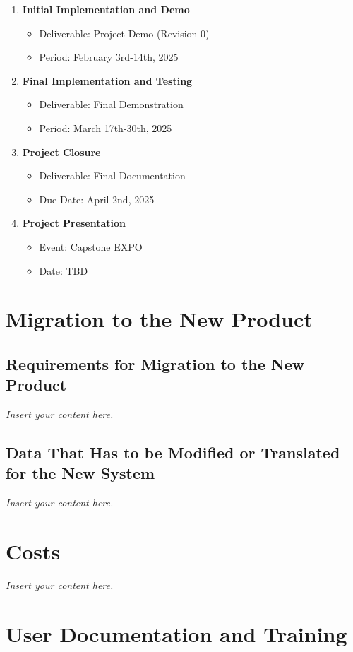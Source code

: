 \documentclass[12pt]{article}
\newcommand{\lips}{\textit{Insert your content here.}}
\begin{document}
\begin{enumerate}
    \item \textbf{Initial Implementation and Demo}
    \begin{itemize}
        \item Deliverable: Project Demo (Revision 0)
        \item Period: February 3rd-14th, 2025
    \end{itemize}
    
    \item \textbf{Final Implementation and Testing}
    \begin{itemize}
        \item Deliverable: Final Demonstration
        \item Period: March 17th-30th, 2025
    \end{itemize}
    
    \item \textbf{Project Closure}
    \begin{itemize}
        \item Deliverable: Final Documentation
        \item Due Date: April 2nd, 2025
    \end{itemize}
    
    \item \textbf{Project Presentation}
    \begin{itemize}
        \item Event: Capstone EXPO
        \item Date: TBD
    \end{itemize}
\end{enumerate}


\section{Migration to the New Product}
\subsection{Requirements for Migration to the New Product}
\lips
\subsection{Data That Has to be Modified or Translated for the New System}
\lips

\section{Costs}
\lips
\section{User Documentation and Training}
\end{document}
